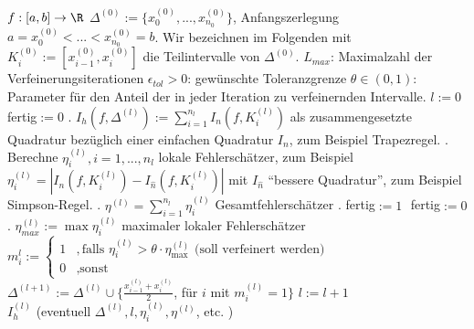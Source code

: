 \documentclass[11pt]{scrbook}
\begin{document}
\begin{alg*}
	\begin{algorithmic}
		\Require $f:[a,b]\to \R$
		\Require $\Delta^{(0)}:=\{x_0^{(0)},..., x_{n_0}^{(0)}\}$, Anfangszerlegung $a=x_0^{(0)}<...<x_{n_0}^{(0)}=b$. 
		Wir bezeichnen im Folgenden mit $K_i^{(0)}:=[x_{i-1}^{(0)}, x_{i}^{(0)}]$ die Teilintervalle von $\Delta^{(0)}$.
		\Require $L_{max}$: Maximalzahl der Verfeinerungsiterationen
		\Require $\epsilon_{tol}>0$: gewünschte Toleranzgrenze
		\Require $\theta\in (0,1)$: Parameter für den Anteil der in jeder Iteration zu verfeinernden Intervalle.
		\State $l:=0$
		\State fertig$:= 0$ %
		. $I_h(f, \Delta^{(l)}):= \sum_{i=1}^{n_l} I_n (f, K_{i}^{(l)})$ als zusammengesetzte Quadratur bezüglich einer einfachen Quadratur $I_n$, zum Beispiel Trapezregel.
		. Berechne $\eta_i^{(l)}, i=1,..., n_l$ lokale Fehlerschätzer, zum Beispiel $\eta_i^{(l)}=|I_n(f, K_i^{(l)})- I_{\hat n} (f, K_i^{(l)})|$ mit $I_{\hat n}$ "`bessere Quadratur"', zum Beispiel Simpson-Regel.
		. $\eta^{(l)}=\sum_{i=1}^{n_l} \eta_i^{(l)}$ Gesamtfehlerschätzer
		.
		 fertig$:= 1$ \Else $ $ fertig$:= 0$ \EndIf
		. 
		\State $\eta_{max}^{(l)}:= \max \eta_i^{(l)}$ maximaler lokaler Fehlerschätzer
		\State $m_i^{l}:=\begin{cases} 1 &, \text{falls $\eta_i^{(l)}>\theta \cdot \eta_{\max}^{(l)}$ (soll verfeinert werden)}\\ 0 &, \text{sonst}\end{cases}$
		\State $\Delta^{(l+1)}:= \Delta^{(l)} \cup \{ \frac{x_{i-1}^{(l)}+x_{i}^{(l)}}{2}$, für $i$ mit $m_i^{(l)}=1\}$
		\State $l:=l+1$
		\EndIf 
		\EndWhile  \\
		\Return $I_h^{(l)}$ (eventuell $\Delta^{(l)}, l, \eta_i^{(l)}, \eta^{(l)}$, etc. )
	\end{algorithmic}
\end{alg*}
\end{document}
